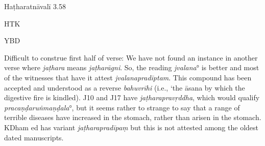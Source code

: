 \begin{ekdosis}
\begin{testimonia}[hp01_027]
\begin{versinnote}
\end{versinnote}

Haṭharatnāvalī 3.58

\begin{versinnote}
\end{versinnote}

HTK

\begin{versinnote}
\end{versinnote}

YBD

\begin{versinnote}
\end{versinnote}

\end{testimonia}

\begin{philcomm}[hp01_027]
Difficult to construe first half of verse:
We have not found an instance in another verse where \emph{jaṭhara} means \emph{jaṭharāgni}. So, the reading \emph{jvalana}° is better and most of the witnesses that have it attest \emph{jvalanapradīptam}. This compound has been accepted and understood as a reverse \emph{bahuvrīhi} (i.e., ‘the āsana by which the digestive fire is kindled). J10 and J17 have \emph{jaṭharapravṛddha}, which would qualify \emph{pracaṇḍaruṅmaṇḍala}°, but it seems rather to strange to say that a range of terrible diseases have increased in the stomach, rather than arisen in the stomach. KDham ed has variant \emph{jaṭharapradīpaṃ} but this is not attested among the oldest dated manuscripts.


\end{philcomm}
\end{ekdosis}
